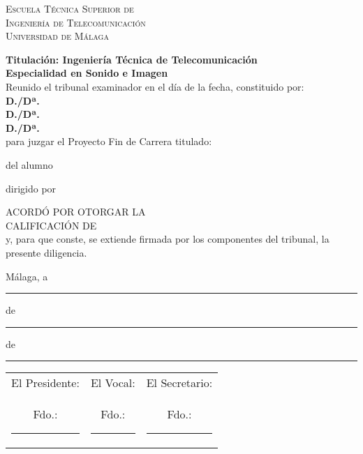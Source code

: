 \thispagestyle{empty}
\begin{spacing}{1}
\begin{center}
	\Large \sffamily \scshape %
	Escuela Técnica Superior de\\
	Ingeniería de Telecomunicación\\
	Universidad de Málaga
\end{center}

	{\bfseries \noindent Titulación: Ingeniería Técnica de Telecomunicación \\
	 Especialidad en Sonido e Imagen}\\[3ex]

	\noindent Reunido el tribunal examinador en el día de la fecha, constituido por:\\[3ex]
	\textbf{D./Dª.~}\hrulefill\\[3ex]
	\textbf{D./Dª.~}\hrulefill\\[3ex]
	\textbf{D./Dª.~}\hrulefill\\[3ex]
	
	para juzgar el Proyecto Fin de Carrera titulado:\noindent 
	
\begin{center}
	\large \bfseries \pfctitlename
\end{center}

\noindent del alumno 

\noindent dirigido por 

\bigskip

	\noindent ACORDÓ POR \hrulefill OTORGAR LA\\[3ex]%
	CALIFICACIÓN DE\hrulefill\\[3ex]
	
	
	\noindent y, para que conste, se extiende firmada por los componentes del tribunal, la presente diligencia.
	
	\bigskip

\hfill Málaga, a \rule{1cm}{0.1mm} de \rule{1cm}{0.1mm} de \rule{0.7cm}{0.1mm}

\vskip 10pt

\begin{center}
	\begin{tabular}{ccc}
	El Presidente: & El Vocal: & El Secretario:\\[2cm]
	Fdo.:\rule{3cm}{0.1mm} & Fdo.:\rule{3cm}{0.1mm} & Fdo.:\rule{3cm}{0.1mm}	
	\end{tabular}
\end{center}
\end{spacing}
\blankpage